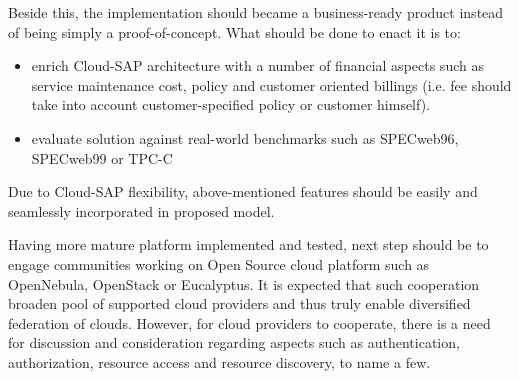 Beside this, the implementation should became a business-ready product instead of being simply a proof-of-concept. What should be done to enact it is to:
\begin{itemize}
 \item enrich Cloud-SAP architecture with a number of financial aspects such as service maintenance cost, policy and customer oriented billings (i.e. fee should take into account customer-specified policy or customer himself).
 \item evaluate solution against real-world benchmarks such as SPECweb96, SPECweb99 or TPC-C
\end{itemize}
Due to Cloud-SAP flexibility, above-mentioned features should be easily and seamlessly incorporated in proposed model.

Having more mature platform implemented and tested, next step should be to engage communities working on Open Source cloud platform such as OpenNebula, OpenStack or Eucalyptus. It is expected that such cooperation broaden pool of supported cloud providers and thus truly enable diversified federation of clouds. However, for cloud providers to cooperate, there is a need for discussion and consideration regarding aspects such as authentication, authorization, resource access and resource discovery, to name a few.

